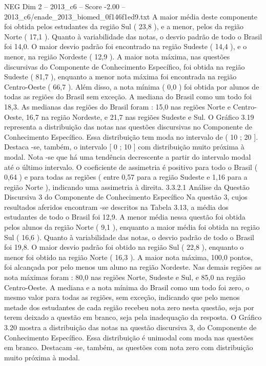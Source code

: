 \begin{textsample}{NEG Dim 2 – 2013\_c6 – Score -2.00 – 2013\_c6/enade\_2013\_biomed\_0f146f1ed9.txt}
A maior média deste componente foi obtida pelos estudantes da região Sul ( 23,8 ), e a menor, pelos da região Norte ( 17,1 ).
Quanto à variabilidade das notas, o desvio padrão de todo o Brasil foi 14,0.
O maior desvio padrão foi encontrado na região Sudeste ( 14,4 ), e o menor, na região Nordeste ( 12,9 ).
A maior nota máxima, nas questões discursivas do Componente de Conhecimento Específico, foi obtida na região Sudeste ( 81,7 ), enquanto a menor nota máxima foi encontrada na região Centro-Oeste ( 66,7 ).
Além disso, a nota mínima ( 0,0 ) foi obtida por alunos de todas as regiões do Brasil sem exceção.
A mediana do Brasil como um todo foi 18,3.
As medianas das regiões do Brasil foram : 15,0 nas regiões Norte e Centro-Oeste, 16,7 na região Nordeste, e 21,7 nas regiões Sudeste e Sul.
O Gráfico 3.19 representa a distribuição das notas nas questões discursivas no Componente de Conhecimento Específico.
Essa distribuição tem moda no intervalo de ( 10 ; 20 ].
Destaca -se, também, o intervalo [ 0 ; 10 ] com distribuição muito próxima à modal.
Nota -se que há uma tendência decrescente a partir do intervalo modal até o último intervalo.
O coeficiente de assimetria é positivo para todo o Brasil ( 0,64 ) e para todas as regiões ( entre 0,57 para a região Sudeste e 1,16 para a região Norte ), indicando uma assimetria à direita. 3.3.2.1 Análise da Questão Discursiva 3 do Componente de Conhecimento Específico Na questão 3, cujos resultados aferidos encontram -se descritos na Tabela 3.13, a média dos estudantes de todo o Brasil foi 12,9.
A menor média nessa questão foi obtida pelos alunos da região Norte ( 9,1 ), enquanto a maior média foi obtida na região Sul ( 16,6 ).
Quanto à variabilidade das notas, o desvio padrão de todo o Brasil foi 19,8.
O maior desvio padrão foi obtido na região Sul ( 22,8 ), enquanto o menor foi obtido na região Norte ( 16,3 ).
A maior nota máxima, 100,0 pontos, foi alcançada por pelo menos um aluno na região Nordeste.
Nas demais regiões as nota máximas foram : 80,0 nas regiões Norte, Sudeste e Sul, e 85,0 na região Centro-Oeste.
A mediana e a nota mínima do Brasil como um todo foi zero, o mesmo valor para todas as regiões, sem exceção, indicando que pelo menos metade dos estudantes de cada região recebeu nota zero nesta questão, seja por terem deixado a questão em branco, seja pela inadequação da resposta.
O Gráfico 3.20 mostra a distribuição das notas na questão discursiva 3, do Componente de Conhecimento Específico.
Essa distribuição é unimodal com moda nas questões em branco.
Destacam -se, também, as questões com nota zero com distribuição muito próxima à modal.

\end{textsample}
